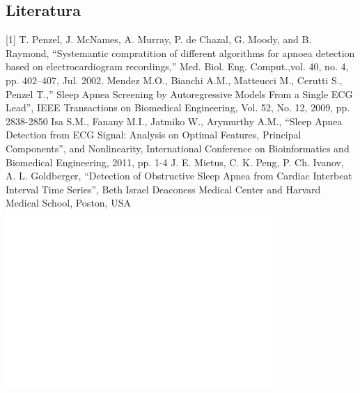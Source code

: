 \subsection{Literatura}
[1] T. Penzel, J. McNames, A. Murray, P. de Chazal, G. Moody, and B. Raymond, “Systemantic compratition of different algorithms for apnoea detection based on electrocardiogram recordings,” Med. Biol. Eng. Comput.,vol. 40, no. 4, pp. 402–407, Jul. 2002.
\newline \newline
[2] Mendez M.O., Bianchi A.M., Matteucci M., Cerutti S., Penzel T.,” Sleep Apnea Screening by Autoregressive Models From a Single ECG Lead”, IEEE Transactions on Biomedical Engineering, Vol. 52, No. 12, 2009, pp. 2838-2850 
\newline \newline
[3] Isa S.M., Fanany M.I., Jatmiko W., Arymurthy A.M., “Sleep Apnea Detection from ECG Signal: Analysis on Optimal Features, Principal Components”, and Nonlinearity, International Conference on Bioinformatics and Biomedical Engineering, 2011, pp. 1-4 
\newline \newline
[4] J. E. Mietus, C. K. Peng, P. Ch. Ivanov, A. L. Goldberger, “Detection of Obstructive Sleep Apnea from Cardiac Interbeat Interval Time Series”, Beth Israel Deaconess Medical Center and Harvard Medical School, Poston, USA
\includegraphics[scale=1.4]{SLEEP_APNEA/img/blank.png}
